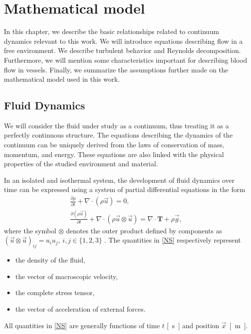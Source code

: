 \chapter{Mathematical model}
In this chapter, we describe the basic relationships related to continuum dynamics relevant to this work. We will introduce equations describing flow in a free environment. We describe turbulent behavior and Reynolds decomposition. Furthermore, we will mention some characteristics important for describing blood flow in vessels. Finally, we summarize the assumptions further made on the mathematical model used in this work.

\section{Fluid Dynamics}
We will consider the fluid under study as a continuum, thus treating it as a perfectly continuous structure. The equations describing the dynamics of the continuum can be uniquely derived from the laws of conservation of mass, momentum, and energy. These equations are also linked with the physical properties of the studied environment and material.

In an isolated and isothermal system, the development of fluid dynamics over time can be expressed using a system of partial differential equations in the form
\\
\begin{subequations}\label{NS}
	\begin{gather}
		\label{a}
		\frac{\partial \rho}{\partial t} + \nabla \cdot (\rho \vec{u}) = 0, \\[5pt]
		\label{b}
		\frac{\partial (\rho \vec{u})}{\partial t} + \nabla \cdot (\rho \vec{u} \otimes \vec{u}) = \nabla \cdot \mathbf{T} + \rho \vec{g},
	\end{gather}
\end{subequations}
where the symbol $ \otimes $ denotes the outer product defined by components as $ (\vec{u} \otimes \vec{u})_{ij} = u_{i} u_{j}, \: i,j \in \{1,2,3\} $ \cite{Anderson}. The quantities in \eqref{NS} respectively represent
\begin{itemize}
	\item[]{\makebox[3cm]{$ \rho $ \si{[kg.m^{-3}]}\hfill} the density of the fluid,}
	\item[]{ the vector of macroscopic velocity,}
	\item[]{ the complete stress tensor,}
	\item[]{ the vector of acceleration of external forces.}
\end{itemize}
All quantities in \eqref{NS} are generally functions of time $ t $ \si{[s]} and position $ \vec{x} $~\si{[m]}.

